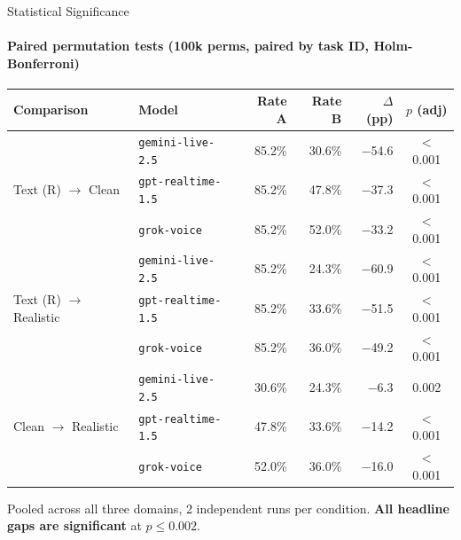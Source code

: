 \documentclass[aspectratio=169]{beamer}
\begin{document}
\begin{frame}{Statistical Significance}
  \framesubtitle{Paired permutation tests (100k perms, paired by task ID, Holm-Bonferroni)}

  \vspace{-0.2em}
  \begin{center}
  \begin{scriptsize}
  \begin{tabular}{llrrrc}
    \toprule
    \textbf{Comparison} & \textbf{Model} & \textbf{Rate A} & \textbf{Rate B} & \textbf{$\Delta$ (pp)} & \textbf{$p$ (adj)} \\
    \midrule
    \multirow{3}{*}{Text (R) $\to$ Clean} & \texttt{gemini-live-2.5}  & 85.2\% & 30.6\% & $-$54.6 & $<$0.001 \\
     & \texttt{gpt-realtime-1.5} & 85.2\% & 47.8\% & $-$37.3 & $<$0.001 \\
     & \texttt{grok-voice}       & 85.2\% & 52.0\% & $-$33.2 & $<$0.001 \\
    \midrule
    \multirow{3}{*}{Text (R) $\to$ Realistic} & \texttt{gemini-live-2.5}  & 85.2\% & 24.3\% & $-$60.9 & $<$0.001 \\
     & \texttt{gpt-realtime-1.5} & 85.2\% & 33.6\% & $-$51.5 & $<$0.001 \\
     & \texttt{grok-voice}       & 85.2\% & 36.0\% & $-$49.2 & $<$0.001 \\
    \midrule
    \multirow{3}{*}{Clean $\to$ Realistic} & \texttt{gemini-live-2.5}  & 30.6\% & 24.3\% & $-$6.3  & 0.002 \\
     & \texttt{gpt-realtime-1.5} & 47.8\% & 33.6\% & $-$14.2 & $<$0.001 \\
     & \texttt{grok-voice}       & 52.0\% & 36.0\% & $-$16.0 & $<$0.001 \\
    \bottomrule
  \end{tabular}
  \end{scriptsize}
  \end{center}

  \vspace{0.3em}
  {\small Pooled across all three domains, 2 independent runs per condition. \textbf{All headline gaps are significant} at $p \le 0.002$.}

\end{frame}

\end{document}
